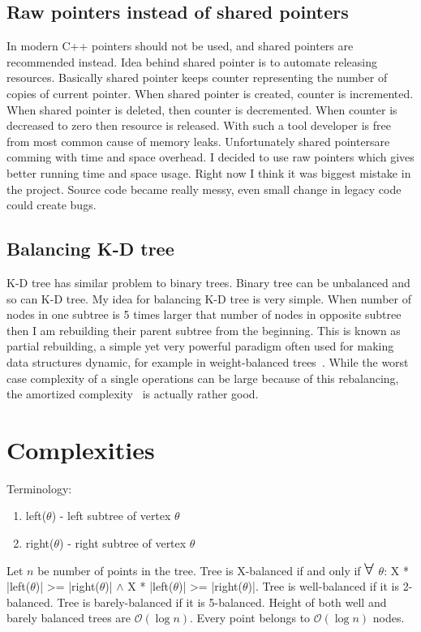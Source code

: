 \documentclass[10pt,a4paper]{article}
\newcommand{\Oh}{\mathcal{O}}
\newcommand\bigforall{\mbox{\Large $\mathsurround0pt\forall$}}
\begin{document}
\subsection{Raw pointers instead of shared pointers}

In modern C++ pointers should not be used, and shared pointers are recommended instead. Idea behind shared pointer is to automate releasing resources. Basically shared pointer keeps counter representing the number of copies of current pointer. When shared pointer is created, counter is incremented. When shared pointer is deleted, then counter is decremented. When counter is decreased to zero then resource is released. With such a tool developer is free from most common cause of memory leaks. Unfortunately shared pointersare comming with time and space overhead. I decided to use raw pointers which gives better running time and space usage.
Right now I think it was biggest mistake in the project. Source code became really messy, even small change in legacy code could create bugs.

\subsection{Balancing K-D tree}
K-D tree has similar problem to binary trees. Binary tree can be unbalanced and so can K-D tree. My idea for balancing K-D tree is very simple. When number of nodes in one subtree is 5 times larger that number of nodes in opposite subtree then I am rebuilding their parent subtree from the beginning.
This is known as partial rebuilding, a simple yet very powerful paradigm often used for making data structures dynamic, for example in weight-balanced trees~\cite{ALPHATREES}. While the worst case complexity of a single operations can be large because of this rebalancing, the amortized complexity~\cite{AMOR} is actually rather good.


\section{Complexities}

Terminology:
\begin{enumerate}
\item left($\theta$) - left subtree of vertex $\theta$
\item right($\theta$) - right subtree of vertex $\theta$
\end{enumerate}

Let $n$ be number of points in the tree. Tree is X-balanced if and only if $\bigforall$ $\theta$: X * |left($\theta$)| >= |right($\theta$)| $\wedge$ X * |left($\theta$)| >= |right($\theta$)|. Tree is well-balanced if it is 2-balanced. Tree is barely-balanced if it is 5-balanced. Height of both well and barely balanced trees are $\Oh(\log n)$. Every point belongs to $\Oh(\log n)$ nodes. 
\end{document}
